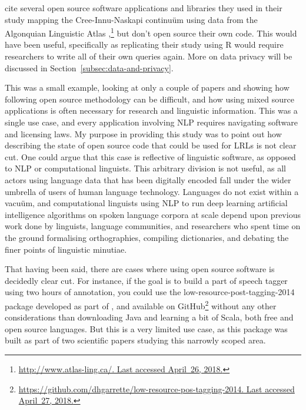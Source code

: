 \citet{cenerini2017mapping} cite several open source software applications and libraries they used in their study mapping the Cree-Innu-Naskapi continu\"{u}m using data from the Algonquian Linguistic Atlas \citep{junker2011linguistic},\footnote{\href{http://www.atlas-ling.ca/}{http://www.atlas-ling.ca/. Last accessed April~26, 2018.}} but don't open source their own code. This would have been useful, specifically as replicating their study using R \citep{ihaka1996r} would require researchers to write all of their own queries again. More on data privacy will be discussed in Section~\ref{subsec:data-and-privacy}.

This was a small example, looking at only a couple of papers and showing how following open source methodology can be difficult, and how using mixed source applications is often necessary for research and linguistic information. This was a single use case, and every application involving NLP requires navigating software and licensing laws. My purpose in providing this study was to point out how describing the state of open source code that could be used for LRLs is not clear cut. One could argue that this case is reflective of linguistic software, as opposed to NLP or computational linguists. This arbitrary division is not useful, as all actors using language data that has been digitally encoded fall under the wider umbrella of users of human language technology. Languages do not exist within a vacu\"{u}m, and computational linguists using NLP to run deep learning artificial intelligence algorithms on spoken language corpora at scale depend upon previous work done by linguists, language communities, and researchers who spent time on the ground formalising orthographies, compiling dictionaries, and debating the finer points of linguistic minutiae.

That having been said, there are cases where using open source software is decidedly clear cut. For instance, if the goal is to build a part of speech tagger using two hours of annotation, you could use the low-resource-post-tagging-2014 package developed as part of \citet{garrette2013real,garrette2013learning}, and available on GitHub\footnote{\href{https://github.com/dhgarrette/low-resource-pos-tagging-2014}{https://github.com/dhgarrette/low-resource-pos-tagging-2014. Last accessed April~27, 2018.}} without any other considerations than downloading Java and learning a bit of Scala, both free and open source languages. But this is a very limited use case, as this package was built as part of two scientific papers studying this narrowly scoped area.

